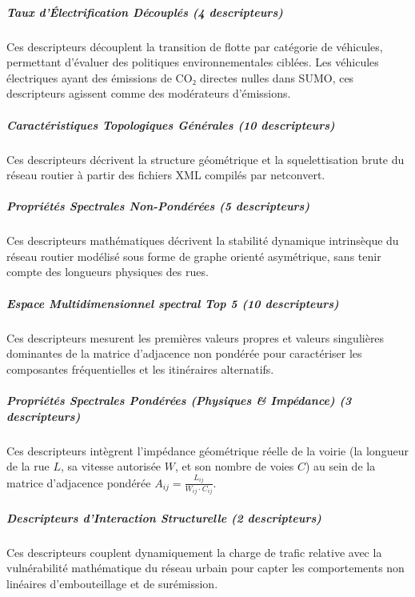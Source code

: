 \documentclass[10pt, a4paper]{article}
\begin{document}
\subparagraph{Taux d'Électrification Découplés (4
descripteurs)}\label{taux-duxe9lectrification-duxe9coupluxe9s-4-descripteurs}

Ces descripteurs découplent la transition de flotte par catégorie de
véhicules, permettant d'évaluer des politiques environnementales
ciblées. Les véhicules électriques ayant des émissions de CO₂ directes
nulles dans SUMO, ces descripteurs agissent comme des modérateurs
d'émissions.

\subparagraph{Caractéristiques Topologiques Générales (10
descripteurs)}\label{caractuxe9ristiques-topologiques-guxe9nuxe9rales-10-descripteurs}

Ces descripteurs décrivent la structure géométrique et la
squelettisation brute du réseau routier à partir des fichiers XML
compilés par netconvert.

\subparagraph{Propriétés Spectrales Non-Pondérées (5
descripteurs)}\label{propriuxe9tuxe9s-spectrales-non-ponduxe9ruxe9es-5-descripteurs}

Ces descripteurs mathématiques décrivent la stabilité dynamique
intrinsèque du réseau routier modélisé sous forme de graphe orienté
asymétrique, sans tenir compte des longueurs physiques des rues.

\subparagraph{Espace Multidimensionnel spectral Top 5 (10
descripteurs)}\label{espace-multidimensionnel-spectral-top-5-10-descripteurs}

Ces descripteurs mesurent les premières valeurs propres et valeurs
singulières dominantes de la matrice d'adjacence non pondérée pour
caractériser les composantes fréquentielles et les itinéraires
alternatifs.

\subparagraph{Propriétés Spectrales Pondérées (Physiques \& Impédance)
(3
descripteurs)}\label{propriuxe9tuxe9s-spectrales-ponduxe9ruxe9es-physiques-impuxe9dance-3-descripteurs}

Ces descripteurs intègrent l'impédance géométrique réelle de la voirie
(la longueur de la rue \(L\), sa vitesse autorisée \(W\), et son nombre
de voies \(C\)) au sein de la matrice d'adjacence pondérée
\(A_{ij} = \frac{L_{ij}}{W_{ij} \cdot C_{ij}}\).

\subparagraph{Descripteurs d'Interaction Structurelle (2
descripteurs)}\label{descripteurs-dinteraction-structurelle-2-descripteurs}

Ces descripteurs couplent dynamiquement la charge de trafic relative
avec la vulnérabilité mathématique du réseau urbain pour capter les
comportements non linéaires d'embouteillage et de surémission.
\end{document}
